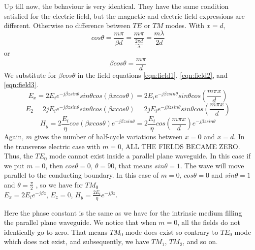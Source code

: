 Up till now, the behaviour is very identical. They have the same condition satisfied for the electric field, but the magnetic and electric field expressions are different. Otherwise no difference between $TE$ or $TM$ modes. With $x = d$,
\begin{dmath*}
cos\theta = \frac{m \pi}{\beta d} =\frac{m \pi}{\frac{2\pi d}{\lambda}} = \frac{m\lambda}{2d}
\end{dmath*} 
or
\begin{dmath*}
\beta cos\theta = \frac{m \pi}{d}
\end{dmath*}
We substitute for $\beta cos\theta$ in the field equations \ref{eqn:field1}, \ref{eqn:field2}, and \ref{eqn:field3}.
\begin{dmath}
E_{x} = 2 E_{i} e^{-j\beta zsin\theta} sin\theta cos(\beta xcos\theta) = 2 E_{i} e^{-j\beta zsin\theta} sin\theta cos(\frac{m\pi x}{d})
\end{dmath}
\begin{dmath}
E_{2} = 2 jE_{i} e^{-j\beta zsin\theta} sin\theta cos(\beta xcos\theta) = 2 jE_{i} e^{-j\beta zsin\theta} sin\theta cos(\frac{m\pi x}{d})
\end{dmath}
\begin{dmath}
H_{y} = 2 \frac{E_{i}}{\eta} cos(\beta xcos\theta) e^{-j\beta zsin\theta} =2 \frac{E_{i}}{\eta} cos(\frac{m\pi x}{d}) e^{-j\beta zsin\theta} 
\end{dmath}
Again, $m$ gives the number of half-cycle variations between $x = 0$ and $x = d$. In the transverse electric case with $m = 0$, ALL THE FIELDS BECAME ZERO. Thus, the $TE_0$ mode cannot exist inside a parallel plane waveguide. In this case if we put $m = 0$, then $cos\theta =0$, $\theta =90$, that means $sin\theta =1$. The wave will move parallel to the conducting boundary. In this case of $m = 0$, $cos\theta =0$ and $sin\theta =1$ and $\theta=\frac{\pi}{2}$ , so we have for $TM_0$\\ 
$E_{x} =2E_{i} e^{-j\beta z}$, $E_{z}= 0$, $H_{y} =\frac{2E_{i}}{\eta} e^{-j\beta z}$.

Here the phase constant is the same as we have for the intrinsic medium filling the parallel plane waveguide. We notice that when $m = 0$, all the fields do not identically go to zero. That means $TM_0$ mode does exist so contrary to $TE_0$ mode which does not exist, and subsequently, we have $TM_{1}$, $TM_{2}$, and so on. 

